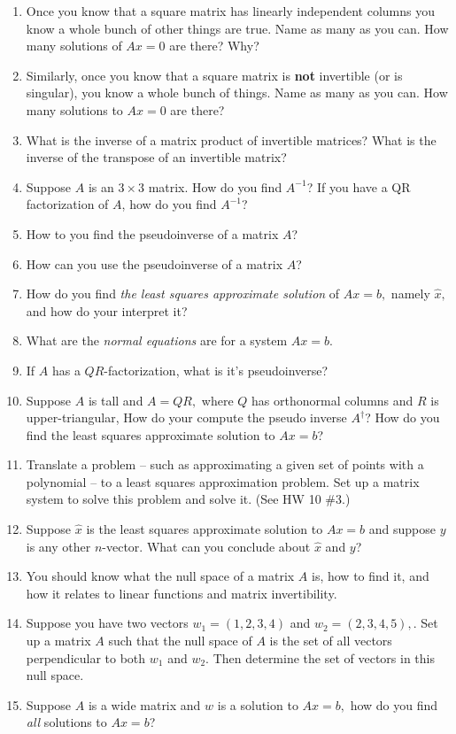 \documentclass[11pt,fleqn]{article}
\begin{document}
\begin{enumerate}
	\item Once you know that a square matrix has linearly independent columns you know a whole bunch 
of other things are true.  Name as many as you can.  How many solutions of $Ax=0$ are there?  Why?
	\item Similarly, once you know that a square matrix is \textbf{not} invertible (or is singular), you know a whole bunch of things. Name as many as you can. How many solutions to $Ax=0$ are there?
	\item What is the inverse of a matrix product of invertible matrices? What is the inverse of the transpose of an invertible matrix?	
	\item Suppose $A$ is an $3\times 3$ matrix.  How do you find $A^{-1}$? 
If you have a QR factorization of $A$, how do you find $A^{-1}$?
	\item How to you find the pseudoinverse of a matrix $A$?
	\item How can you use the pseudoinverse of a matrix $A$?
	\item How do you find  \emph{the least squares approximate solution} of $Ax=b,$ namely $\hat{x},$ and how do your interpret it?
	\item What are the \emph{normal equations} are for a system $Ax=b.$
	\item If $A$ has a $QR$-factorization, what is it's pseudoinverse?
	\item Suppose $A$ is tall and $A=QR,$ where $Q$ has orthonormal columns and $R$ is upper-triangular, How do your compute the pseudo inverse $A^\dagger$? How do you find the least squares approximate solution to $Ax=b$?
	\item Translate a problem -- such as approximating a given set of points with a polynomial -- to a least squares approximation problem. Set up a matrix system to solve this problem and solve it. (See HW 10 \#3.)
	\item Suppose $\hat{x}$ is the least squares approximate solution to $Ax=b$ and suppose $y$ is any other $n$-vector. What can you conclude about $\hat{x}$ and $y$?
	\item You should know what the null space of a matrix $A$ is, how to find it, and how it relates to linear functions and matrix invertibility.
	\item Suppose you have two vectors $w_1=(1,2,3,4)$ and $w_2=(2,3,4,5),$. Set up a matrix $A$ such that the null space of $A$ is the set of all vectors perpendicular to both $w_1$ and $w_2.$ Then determine the set of vectors in this null space.
	\item Suppose $A$ is a wide matrix and $w$ is a solution to $Ax=b,$ how do you find \emph{all} solutions to $Ax=b$?

\end{enumerate}
\end{document}
